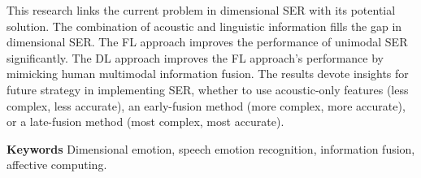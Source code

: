 This research links the current problem in dimensional SER with its potential
solution. The combination of acoustic and linguistic information fills the gap
in dimensional SER. The FL approach improves the performance of unimodal SER
significantly. The DL approach improves the FL approach's performance by
mimicking human multimodal information fusion. The results devote insights for
future strategy in implementing SER, whether to use acoustic-only features
(less complex, less accurate), an early-fusion method (more complex, more
accurate), or a late-fusion method (most complex, most accurate).

\noindent \textbf{Keywords} Dimensional emotion, speech emotion recognition, information
fusion, affective computing.